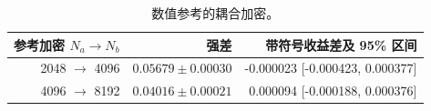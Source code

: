 \begin{table}[H]\centering\small
\caption{数值参考的耦合加密。}\label{tab:na-reference-cn}
\begin{tabular}{rrr}\toprule
参考加密 $N_a\to N_b$ & 强差 & 带符号收益差及 95\% 区间\\\midrule
2048 $\to$ 4096 & $0.05679\pm0.00030$ & -0.000023 [-0.000423, 0.000377]\\
4096 $\to$ 8192 & $0.04016\pm0.00021$ & 0.000094 [-0.000188, 0.000376]\\
\bottomrule\end{tabular}
\end{table}
